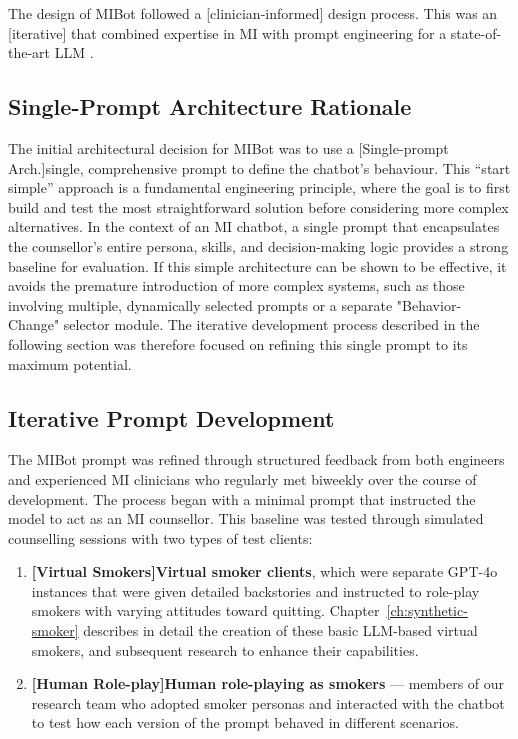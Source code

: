 The design of MIBot followed a [clinician-informed] design process. This was an [iterative] that combined expertise in MI with prompt engineering for a state-of-the-art LLM \cite{openai2024gpt4ocard}.

\subsection{Single-Prompt Architecture Rationale}
\label{sec:single-prompt-rationale}

The initial architectural decision for MIBot was to use a [Single-prompt Arch.]single, comprehensive prompt to define the chatbot's behaviour. This ``start simple'' approach is a fundamental engineering principle, where the goal is to first build and test the most straightforward solution before considering more complex alternatives. In the context of an MI chatbot, a single prompt that encapsulates the counsellor's entire persona, skills, and decision-making logic provides a strong baseline for evaluation. If this simple architecture can be shown to be effective, it avoids the premature introduction of more complex systems, such as those involving multiple, dynamically selected prompts or a separate "Behavior-Change" selector module. The iterative development process described in the following section was therefore focused on refining this single prompt to its maximum potential.

\subsection{Iterative Prompt Development}
The MIBot prompt was refined through structured feedback from both engineers and experienced MI clinicians who regularly met biweekly over the course of development. The process began with a minimal prompt that instructed the model to act as an MI counsellor. This baseline was tested through simulated counselling sessions with two types of test clients:

\begin{enumerate}
    \item \textbf{[Virtual Smokers]Virtual smoker clients}, which were separate GPT-4o instances that were given detailed backstories and instructed to role-play smokers with varying attitudes toward quitting. Chapter~\ref{ch:synthetic-smoker} describes in detail the creation of these basic LLM-based virtual smokers, and subsequent research to enhance their capabilities.
    \item \textbf{[Human Role-play]Human role-playing as smokers} --- members of our research team who adopted smoker personas and interacted with the chatbot to test how each version of the prompt behaved in different scenarios.
\end{enumerate}

